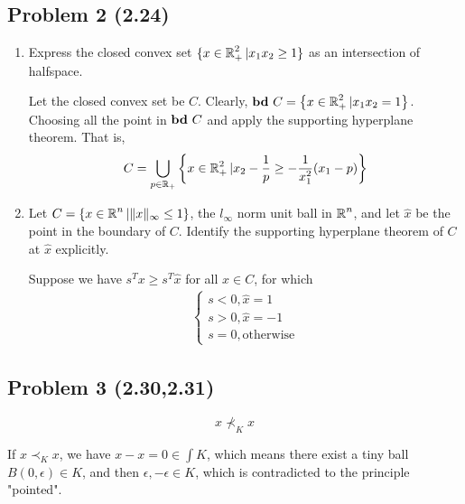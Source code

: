 \documentclass[en,hazy,blue,10pt,device = normal]{elegantnote}
\begin{document}
\subsection*{Problem 2 (2.24)}
\begin{enumerate}[{ (a)}]
    \item Express the closed convex set \(\{x \in \operatorname{\mathbb R}_+^2 | x_1 x_2 \geq 1 \}\) as an intersection of halfspace.
    \begin{tcolorbox}
        \sol

        Let the closed convex set be \(C\). Clearly, \({\textbf{bd}\ } C = \left\{ x \in \operatorname{\mathbb R}_+^2 | x_1 x_2 = 1 \right\}\). Choosing all the point in \({\textbf{bd}\ } C\) and apply the supporting hyperplane theorem. That is, 
        \[C = \bigcup _{p \in \operatorname{\mathbb R}_+} \left\{x\in \operatorname{\mathbb R}_+^2 | x_2 - \frac 1 p \geq - \frac{1}{x_1^2}( x_1 - p)\right\}\]

    \end{tcolorbox}
    \item Let \(C = \left\{x \in \operatorname{\mathbb R}^n | \Vert x \Vert _\infty  \leq 1\right\}\), the \(l _\infty\) norm unit ball in \(\operatorname{\mathbb R}^n\), and let \(\hat x\) be the point in the boundary of \(C\). Identify the supporting hyperplane theorem of \(C\) at \(\hat x\) explicitly.
    \begin{tcolorbox}
        \sol

        Suppose we have \(s^T x \geq s^T \hat x\) for all \(x \in C\), for which
        \begin{align*}
            \begin{cases}
                s < 0, \hat x = 1 \\
                s > 0, \hat x = -1 \\
                s = 0, \text{otherwise}
            \end{cases}
        \end{align*}
    \end{tcolorbox}

\end{enumerate}

\subsection*{Problem 3 (2.30,2.31)}
\vspace*{-2em}
{\large \[x\nprec_K x\]}
\vspace{-1em}
\begin{tcolorbox}
    \pf

    If \(x\prec_K x\), we have \(x - x = 0 \in \int K\), which means there exist a tiny ball \(B(0,\epsilon) \in K\), and then \(\epsilon,-\epsilon \in K\), which is contradicted to the principle "pointed".
\end{tcolorbox}
\end{document}

